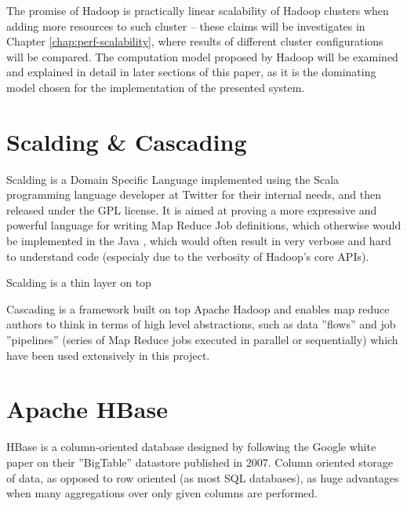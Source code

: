 The promise of Hadoop is practically linear scalability of Hadoop clusters when adding more resources to such cluster -- these claims will be investigates in Chapter \ref{chap:perf-scalability}, where results of different cluster configurations will be compared. The computation model proposed by Hadoop will be examined and explained in detail in later sections of this paper, as it is the dominating model chosen for the implementation of the presented system.

\section{Scalding \& Cascading}
\label{sec:scalding-info}

Scalding is a Domain Specific Language implemented using the Scala \cite{scala} programming language developer at Twitter \cite{twitter} for their internal needs, and then released under the GPL license. It is aimed at proving a more expressive and powerful language for writing Map Reduce Job definitions, which otherwise
would be implemented in the Java \cite{java}, which would often result in very verbose and hard to understand code (especialy due to the verbosity of Hadoop's core APIs).

Scalding is a thin layer on top

Cascading is a framework built on top Apache Hadoop and enables map reduce authors to think in terms of high level abstractions, such as data ''flows'' 
and job ''pipelines'' (series of Map Reduce jobs executed in parallel or sequentially) which have been used extensively in this project.


\section{Apache HBase}
\label{sec:hbase}

HBase is a column-oriented database \cite{columnar-database} designed by following the Google white paper on their ''BigTable'' datastore published in 2007.
Column oriented storage of data, as opposed to row oriented (as most SQL databases), as huge advantages when many aggregations over only given columns are performed.

